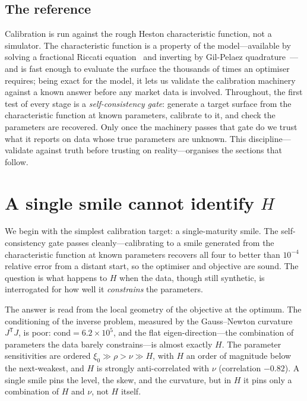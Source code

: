 \documentclass[namedate,webpdf]{ima-authoring-template}
\numberwithin{equation}{section}
\begin{document}
\subsection{The reference}

Calibration is run against the rough Heston characteristic function, not a simulator. The
characteristic function is a property of the model---available by solving a fractional Riccati
equation~\citep{eer2019} and inverting by Gil-Pelaez quadrature~\citep{gilpelaez1951}---and is
fast enough to evaluate the surface the thousands of times an optimiser requires; being exact for
the model, it lets us validate
the calibration machinery against a known answer before any market data is involved. Throughout,
the first test of every stage is a \emph{self-consistency gate}: generate a target surface from
the characteristic function at known parameters, calibrate to it, and check the parameters are
recovered. Only once the machinery passes that gate do we trust what it reports on data whose
true parameters are unknown. This discipline---validate against truth before trusting on
reality---organises the sections that follow.

\section{A single smile cannot identify \texorpdfstring{$H$}{H}}\label{sec:single}

We begin with the simplest calibration target: a single-maturity smile. The self-consistency
gate passes cleanly---calibrating to a smile generated from the characteristic function at known
parameters recovers all four to better than $10^{-4}$ relative error from a distant start, so the
optimiser and objective are sound. The question is what happens to $H$ when the data, though still
synthetic, is interrogated for how well it \emph{constrains} the parameters.

The answer is read from the local geometry of the objective at the optimum. The conditioning of
the inverse problem, measured by the Gauss--Newton curvature $J^{\mathsf T}J$, is poor:
$\mathrm{cond}=6.2\times 10^{5}$, and the flat eigen-direction---the combination of parameters
the data barely constrains---is almost exactly $H$. The parameter sensitivities are ordered
$\xi_0 \gg \rho > \nu \gg H$, with $H$ an order of magnitude below the next-weakest, and $H$ is
strongly anti-correlated with $\nu$ (correlation $-0.82$). A single smile pins the level, the
skew, and the curvature, but in $H$ it pins only a combination of $H$ and $\nu$, not $H$ itself.
\end{document}
